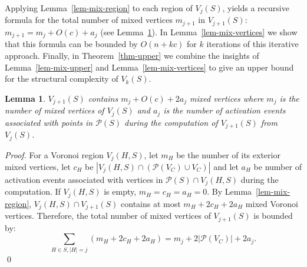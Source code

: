 \documentclass[11pt]{llncs}
\newtheorem{Lemma}{Lemma}
\renewcommand{\P}{\ensuremath{\mathcal{P}}}
\begin{document}
Applying Lemma~\ref{lem-mix-region} to each region of $V_j(S)$, yields a recursive formula for the total number of mixed vertices $m_{j+1}$ in $V_{j+1}(S)$: $m_{j+1}=m_j+O(c)+a_j$ (see Lemma~\ref{lem-mix-diagram}). In Lemma~\ref{lem-mix-vertices} we show that this formula can be bounded by $O(n+kc)$ for $k$ iterations of this iterative approach. Finally, in Theorem~\ref{thm-upper} we combine the insights of Lemma~\ref{lem-mix-upper} and Lemma~\ref{lem-mix-vertices} to give an upper bound for the structural complexity of $V_k(S)$. 


\newcommand{\lemmixdiagramtext}{$V_{j+1}(S)$ contains $m_j+O(c)+2a_j$ mixed vertices
where $m_j$ is the number of mixed vertices of $V_{j}(S)$ and
$a_j$ is the number of activation events associated with points in $\P(S)$ during the computation of $V_{j+1}(S)$ from $V_j(S)$.
}

\begin{Lemma}\label{lem-mix-diagram}
\lemmixdiagramtext
\end{Lemma}
\begin{proof}

For a Voronoi region $V_j(H, S)$,
let $m_H$ be the number of its exterior mixed vertices,
let $c_H$ be $|V_j(H, S) \cap (\P(V_C)\cup V_C)|$ and let $a_H$ be number of activation events associated
with vertices in $\P(S)\cap V_j(H, S)$ during the computation.
If $V_j(H, S)$ is empty, $m_H=c_H=a_H=0$.
By Lemma~\ref{lem-mix-region},
$V_j(H, S)\cap V_{j+1}(S)$ contains at most $m_H + 2c_H + 2a_H$ mixed Voronoi vertices.
Therefore, the total number of mixed vertices of $V_{j+1}(S)$ is bounded by:
\[\sum_{H\in S, |H|=j}( m_H+2c_H+2a_H )= m_j+2|\P(V_C)|+2a_j.\]
\qed


\end{proof}

\newcommand{\lemmixverticestext}
{
The number of mixed vertices of $V_k(S)$ is $O(n+kc)$.
}
\end{document}
